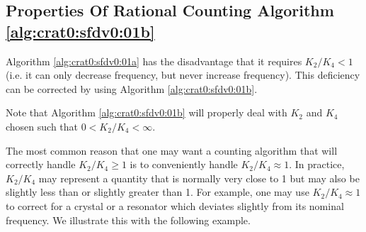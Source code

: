 \subsection[Properties Of Algorithm \ref{alg:crat0:sfdv0:01b}]
           {Properties Of Rational Counting Algorithm \ref{alg:crat0:sfdv0:01b}}
\label{crat0:sfdv0:sprc1}

Algorithm \ref{alg:crat0:sfdv0:01a}
has the disadvantage that it requires $K_2/K_4 < 1$ (i.e. it can only
decrease frequency, but never increase frequency).  This deficiency
can be corrected by using 
Algorithm \ref{alg:crat0:sfdv0:01b}.

Note that Algorithm \ref{alg:crat0:sfdv0:01b} will properly deal with $K_2$ and 
$K_4$ chosen such that $0 < K_2/K_4 <                                                                       \infty$.

The most common reason that one may want a counting algorithm 
that will correctly handle 
$K_2/K_4 \geq 1$ is to conveniently handle $K_2/K_4 \approx 1$.
In practice, $K_2/K_4$ may represent a quantity that is 
normally very close to
1 but may also be slightly less than or slightly greater than 1.
For example, one may use $K_2/K_4 \approx 1$ to correct for a 
crystal or a resonator which deviates slightly from its nominal 
frequency.  We illustrate this with the following example.

